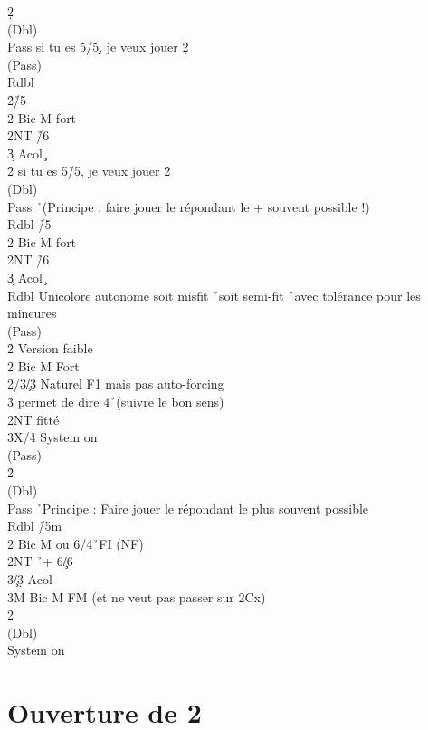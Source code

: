 \documentclass[a4paper]{article}
\begin{document}
\begin{bidtable}
2\d\+\\
(Dbl)\+\\
Pass \> si tu es 5\h /5\d , je veux jouer 2\d \+\\
(Pass)\+\\
Rdbl \h \\
2\h {}\h /5\c \\
2\s \> Bic M fort\\
2NT \h /6\c \\
3\c \> Acol \c \-\-\\
2\h \> si tu es 5\h /5\d , je veux jouer 2\h \+\\
(Dbl)\+\\
Pass \h\ (Principe : faire jouer le répondant le + souvent possible !)\\
Rdbl \h /5\c \\
2\s \> Bic M fort\\
2NT \h /6\c \\
3\c \> Acol \c \-\-\\
Rdbl \> Unicolore autonome soit misfit \h\ soit semi-fit \h\ avec tolérance pour les mineures\+\\
(Pass)\+\\
2\h \> Version faible\\
2\s \> Bic M Fort\-\-\\
2\s/3\c/3\d \> Naturel F1 mais pas auto-forcing\\
3\h \> permet de dire 4\h\ (suivre le bon sens)\\
2NT \> fitté\\
3X/4\h \> System on\-\\
(Pass)\+\\
2\h\+\\
(Dbl)\+\\
Pass \h\ Principe : Faire jouer le répondant le plus souvent possible\\
Rdbl \h /5m\\
2\s \> Bic M ou 6\s /4\h\ FI (NF)\\
2NT \h\ + 6\c /6\d \\
3\c/3\d \> Acol\\
3M \> Bic M FM (et ne veut pas passer sur 2Cx)\-\-\\
2\s\+\\
(Dbl)\+\\
System \> on\-\-\-\-
\end{bidtable}

\section{Ouverture de 2\pdfh}
\end{document}
